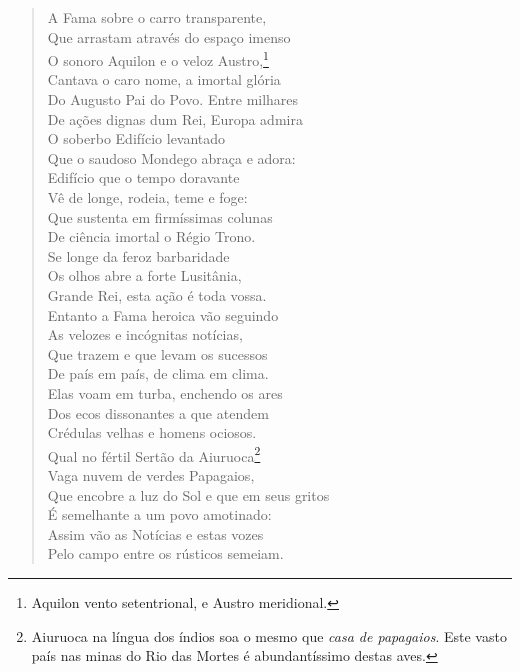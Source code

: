 \begin{verse}

A Fama sobre o carro transparente,\\		\index{\Fama}
Que arrastam através do espaço imenso\\
O sonoro Aquilon e o veloz Austro,\footnote{ Aquilon vento setentrional, e Austro meridional.}\\		\index{\Aquil}
Cantava o caro nome, a imortal glória\\
Do Augusto Pai do Povo. Entre milhares\\ \index{\Aug} 	\index{\Paida}
De ações dignas dum Rei, Europa admira\\
O soberbo Edifício levantado\\
Que o saudoso Mondego abraça e adora:\\ 		\index{\Monde}
Edifício que o tempo doravante\\
Vê de longe, rodeia, teme e foge:\\
Que sustenta em firmíssimas colunas\\
De ciência imortal o Régio Trono. \\[10pt]


Se longe da feroz barbaridade\\
Os olhos abre a forte Lusitânia,\\
Grande Rei, esta ação é toda vossa. \\[10pt]


Entanto a Fama heroica vão seguindo\\		\index{\Fama}
As velozes e incógnitas notícias,\\
Que trazem e que levam os sucessos\\
De país em país, de clima em clima.\\
Elas voam em turba, enchendo os ares\\
Dos ecos dissonantes a que atendem\\
Crédulas velhas e homens ociosos.\\
Qual no fértil Sertão da Aiuruoca\footnote{ Aiuruoca na língua dos índios		
soa o mesmo que \textit{casa de papagaios}. Este vasto país nas minas do Rio das Mortes
é abundantíssimo destas aves.}\\		\index{\Aiur}
Vaga nuvem de verdes Papagaios,\\
Que encobre a luz do Sol e que em seus gritos\\
É semelhante a um povo amotinado:\\
Assim vão as Notícias e estas vozes\\
Pelo campo entre os rústicos semeiam. \\[10pt]



\end{verse}
